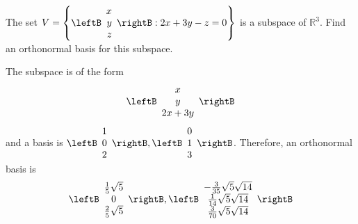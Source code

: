 \begin{enumialphparenastyle}
\begin{ex} The set $V =  \left\{ \leftB
\begin{array}{r}
 x \\
y \\
z
\end{array}
\rightB :2x+3y-z=0\right\} $ is
a subspace of $\mathbb{R}^{3}.$ Find an orthonormal basis for this subspace.
\begin{sol}
The subspace is of the form
\[
\leftB
\begin{array}{c}
x \\
y \\
2x+3y
\end{array}
\rightB
\]
and a basis is $\leftB
\begin{array}{c}
1 \\
0 \\
2
\end{array}
\rightB ,\leftB
\begin{array}{c}
0 \\
1 \\
3
\end{array}
\rightB $. Therefore, an orthonormal basis is
\[
\leftB
\begin{array}{c}
\frac{1}{5}\sqrt{5} \\
0 \\
\frac{2}{5}\sqrt{5}
\end{array}
\rightB ,\leftB
\begin{array}{c}
-\frac{3}{35}\sqrt{5}\sqrt{14} \\
\frac{1}{14}\sqrt{5}\sqrt{14} \\
\frac{3}{70}\sqrt{5}\sqrt{14}
\end{array}
\rightB
\]
\end{sol}
\end{ex}

\end{enumialphparenastyle}